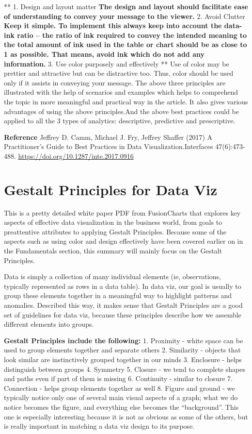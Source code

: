 \documentclass[]{book}
\theoremstyle{definition}
\theoremstyle{definition}
\theoremstyle{definition}
\theoremstyle{remark}
\begin{document}
** 1. Design and layout matter \textbf{ The design and layout should
facilitate ease of understanding to convey your message to the viewer. }
2. Avoid Clutter \textbf{ Keep it simple. To implement this always keep
into account the data-ink ratio -- the ratio of ink required to convey
the intended meaning to the total amount of ink used in the table or
chart should be as close to 1 as possible. That means, avoid ink which
do not add any information. } 3. Use color purposely and effectively **
Use of color may be prettier and attractive but can be distractive too.
Thus, color should be used only if it assists in conveying your message.
The above three principles are illustrated with the help of scenarios
and examples which helps to comprehend the topic in more meaningful and
practical way in the article. It also gives various advantages of using
the above principles.And the above best practices could be applied to
all the 3 types of analytics: descriptive, predictive and prescriptive.

\textbf{Reference} Jeffrey D. Camm, Michael J. Fry, Jeffrey Shaffer
(2017) A Practitioner's Guide to Best Practices in Data
Visualization.Interfaces 47(6):473-488.
\url{https://doi.org/10.1287/inte.2017.0916}

\section{Gestalt Principles for Data
Viz}\label{gestalt-principles-for-data-viz}

\citep{principles-fusioncharts}

This is a pretty detailed white paper PDF from FusionCharts that
explores key aspects of effective data visualization in the business
world, from goals to preattentive attributes to applying Gestalt
Principles. Because some of the aspects such as using color and design
effectively have been covered earlier on in the Fundamentals section,
this summary will mainly focus on the Gestalt Principles.

Data is simply a collection of many individual elements (ie,
observations, typically represented as rows in a data table). In data
viz, our goal is usually to group these elements together in a
meaningful way to highlight patterns and anomalies. Described this way,
it makes sense that Gestalt Principles are a good set of guidelines for
data viz, because these principles describe how we assemble different
elements into groups.

\textbf{Gestalt Principles include the following:} 1. Proximity - white
space can be used to group elements together and separate others 2.
Similarity - objects that look similar are instinctively grouped
together in our minds 3. Enclosure - helps distinguish between groups 4.
Symmetry 5. Closure - we tend to complete shapes and paths even if part
of them is missing 6. Continuity - similar to closure 7. Connection -
helps group elements together as well 8. Figure and ground - we
typically notice only one of several main visual aspects of a graph;
what we do notice becomes the figure, and everything else becomes the
``background''. This one is especially interesting because it is not as
obvious as some of the others, but is really important in matching a
data viz design to its purpose.
\end{document}
